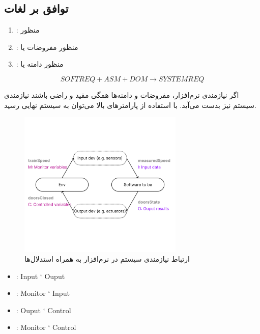\subsection{توافق بر لغات}

\begin{enumerate}
    \item {}: منظور 
    \item {}: منظور مفروضات یا 
    \item {}: منظور دامنه یا 
\end{enumerate}

\begin{equation}
    SOFTREQ + ASM + DOM \rightarrow SYSTEMREQ
\end{equation}

اگر نیازمندی نرم‌افزار، مفروضات و دامنه‌ها همگی مقید و راضی باشند نیازمندی سیستم
نیز بدست می‌آید. با استفاده از پارامتر‌های بالا می‌توان به سیستم نهایی رسید.

\begin{figure}[H]
    \centering
    \includegraphics[width=0.7\textwidth]{images/train_sysreq.png}
    \caption{ارتباط نیازمندی سیستم در نرم‌افزار به همراه استدلال‌ها}
    \label{fig: }
\end{figure}


\begin{LTR}
    \begin{itemize}
        \item {}: Input ` Ouput
        \item {}: Monitor ` Input
        \item {}: Ouput ` Control
        \item {}: Monitor ` Control
    \end{itemize}
\end{LTR}

